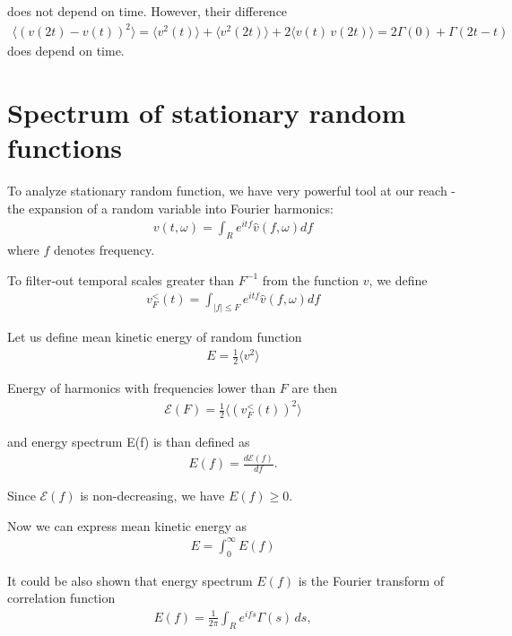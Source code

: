{%
does not depend on time.
However, their difference
\begin{align}
\langle (v(2t) - v(t))^2 \rangle = \langle v^2(t) \rangle + \langle v^2(2t) \rangle + 2\langle v(t)\,v(2t) \rangle = 2\Gamma(0) + \Gamma(2t - t)
\end{align} 
does depend on time.

\section{Spectrum of stationary random functions}

To analyze stationary random function, we have very powerful tool at our reach - the expansion of a random variable into Fourier harmonics:
\begin{align}
v(t,\omega) = \int_{R} e^{itf} \hat{v}(f,\omega) df
\end{align}
where $f$ denotes frequency.

To filter-out temporal scales greater than $F^{-1}$ from the function $v$, we define
\begin{align}
v_F^{<}(t) = \int_{|f| \leq F} e^{itf} \hat{v}(f,\omega) df
\end{align} 

\bigskip

Let us define mean kinetic energy of random function 
\begin{align}
E = \frac{1}{2} \langle v^2 \rangle
\end{align}

Energy of harmonics with frequencies lower than $F$ are then
\begin{align}
\mathcal{E}(F) = \frac{1}{2} \langle (v_F^{<}(t))^2 \rangle
\end{align}

and energy spectrum E(f) is than defined as
\begin{align}
E(f) = \frac{d\mathcal{E}(f)}{df}.
\end{align}

Since $\mathcal{E}(f)$ is non-decreasing, we have $E(f) \geq 0$.

\bigskip

Now we can express mean kinetic energy as
\begin{align}
E = \int_0^{\infty} E(f)
\end{align}

It could be also shown that energy spectrum $E(f)$ is the Fourier transform of correlation function
\begin{align} 
E(f)  = \frac{1}{2\pi} \int_{R} e^{ifs} \Gamma(s) \,ds,
\end{align}

}
